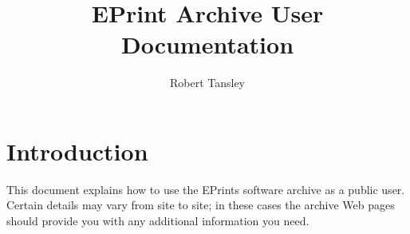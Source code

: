 \documentclass[a4paper]{article}
\title{EPrint Archive User Documentation}
\author{Robert Tansley}
\begin{document}
\maketitle

\section{Introduction}

This document explains how to use the EPrints software archive as a public user. Certain details may vary from site to site; in these cases the archive Web pages should provide you with any additional information you need.






\end{document}
